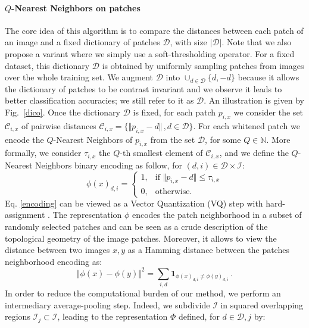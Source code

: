 \documentclass{article} %
\begin{document}
\paragraph{$Q$-Nearest Neighbors on patches}
The core idea of this algorithm is to compare the distances between each patch of an image and a fixed dictionary of patches $\mathcal{D}$, with size $|\mathcal{D}|$. Note that we also propose a variant where we simply use a soft-thresholding operator.
For a fixed dataset, this dictionary $\mathcal{D}$ is obtained by uniformly sampling patches from images over the whole training set. We augment $\mathcal{D}$ into $\cup_{d\in \mathcal{D}}\{d,-d\}$ because it allows the dictionary of patches to be contrast invariant and we observe it leads to better classification accuracies; we still refer to it as $\mathcal{D}$. An illustration is given by Fig.~\ref{dico}. Once the dictionary $\mathcal{D}$ is fixed, for each patch $p_{i,x}$ we consider the set $\mathcal{C}_{i, x}$ of pairwise distances $\mathcal{C}_{i, x} =\{\Vert p_{i, x} - d \Vert\,, d\in\mathcal{D} \} $.
For each whitened patch we encode the $Q$-Nearest Neighbors of $p_{i,x}$ from the set $\mathcal{D}$, for some $ Q \in \mathbb{N}$.
More formally, we consider $\tau_{i,x}$ the $Q$-th smallest  element of $\mathcal{C}_{i,x}$, and we define the $Q$-Nearest Neighbors binary encoding as follow, for $(d,i)\in\mathcal{D}\times\mathcal{I}$:
\begin{equation}
\label{encoding}
\phi(x)_{d,i}=
\begin{cases}
1,&\text{if } \Vert  p_{i,x} - d\Vert \leq \tau_{i,x}\\
0,&\text{otherwise}.
\end{cases} 
\end{equation}
Eq. \ref{encoding} can be viewed as a Vector Quantization (VQ) step with hard-assignment \citep{coates2011importance}.
The representation $\phi$ encodes the patch neighborhood in a subset of randomly selected patches and can be seen as a crude description of the topological geometry of the image patches.
Moreover, it allows to view the distance between two images $x,y$ as a Hamming distance between the patches neighborhood encoding as:
\begin{equation}
\Vert \phi(x)-\phi(y)\Vert^2 = \sum_{i,d}\mathbf{1}_{\phi(x)_{d,i} \neq \phi(y)_{d,i}}\,.
\end{equation}
In order to reduce the computational burden of our method, we perform an intermediary average-pooling step.
Indeed, we subdivide $\mathcal{I}$ in squared overlapping regions $\mathcal{I}_j\subset\mathcal{I}$, leading to the representation $\Phi$ defined, for $d\in\mathcal{D}, j$ by:
\end{document}
